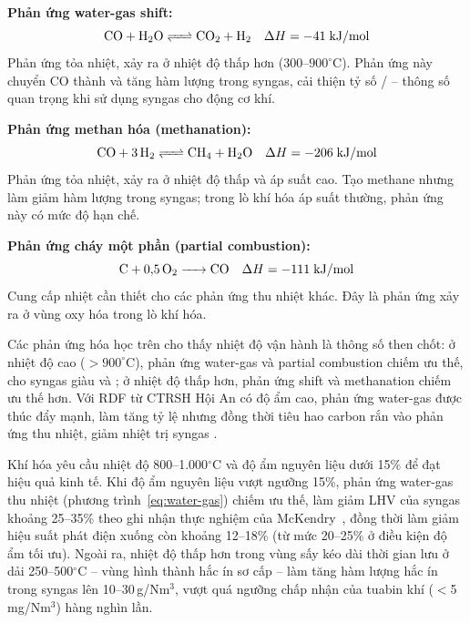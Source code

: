 \documentclass[../main.tex]{subfiles}
\begin{document}
\textbf{Phản ứng water-gas shift:}
\begin{equation}
\ce{CO + H2O <=> CO2 + H2} \quad \Delta H = -41 \;\text{kJ/mol}
\label{eq:shift}
\end{equation}
Phản ứng tỏa nhiệt, xảy ra ở nhiệt độ thấp hơn ($300$--$900^\circ\mathrm{C}$). Phản ứng này chuyển CO thành  và tăng hàm lượng  trong syngas, cải thiện tỷ số / -- thông số quan trọng khi sử dụng syngas cho động cơ khí.

\textbf{Phản ứng methan hóa (methanation):}
\begin{equation}
\ce{CO + 3H2 <=> CH4 + H2O} \quad \Delta H = -206 \;\text{kJ/mol}
\label{eq:methan}
\end{equation}
Phản ứng tỏa nhiệt, xảy ra ở nhiệt độ thấp và áp suất cao. Tạo methane nhưng làm giảm hàm lượng  trong syngas; trong lò khí hóa áp suất thường, phản ứng này có mức độ hạn chế.

\textbf{Phản ứng cháy một phần (partial combustion):}
\begin{equation}
\ce{C + 0,5 O2 -> CO} \quad \Delta H = -111 \;\text{kJ/mol}
\end{equation}
Cung cấp nhiệt cần thiết cho các phản ứng thu nhiệt khác. Đây là phản ứng xảy ra ở vùng oxy hóa trong lò khí hóa.

Các phản ứng hóa học trên cho thấy nhiệt độ vận hành là thông số then chốt: ở nhiệt độ cao ($> 900^\circ\mathrm{C}$), phản ứng water-gas và partial combustion chiếm ưu thế, cho syngas giàu  và ; ở nhiệt độ thấp hơn, phản ứng shift và methanation chiếm ưu thế hơn. Với RDF từ CTRSH Hội An có độ ẩm cao, phản ứng water-gas được thúc đẩy mạnh, làm tăng tỷ lệ  nhưng đồng thời tiêu hao carbon rắn vào phản ứng thu nhiệt, giảm nhiệt trị syngas \cite{Arena2012}.

Khí hóa yêu cầu nhiệt độ 800--1.000$^\circ\mathrm{C}$ và độ ẩm nguyên liệu dưới 15\% để đạt hiệu quả kinh tế. Khi độ ẩm nguyên liệu vượt ngưỡng 15\%, phản ứng water-gas thu nhiệt (phương trình~\ref{eq:water-gas}) chiếm ưu thế, làm giảm LHV của syngas khoảng 25--35\% theo ghi nhận thực nghiệm của McKendry~\cite{McKendry2002}, đồng thời làm giảm hiệu suất phát điện xuống còn khoảng 12--18\% (từ mức 20--25\% ở điều kiện độ ẩm tối ưu). Ngoài ra, nhiệt độ thấp hơn trong vùng sấy kéo dài thời gian lưu ở dải 250--500$^\circ\mathrm{C}$ -- vùng hình thành hắc ín sơ cấp -- làm tăng hàm lượng hắc ín trong syngas lên 10--30\,g/Nm$^3$, vượt quá ngưỡng chấp nhận của tuabin khí ($<$5\,mg/Nm$^3$) hàng nghìn lần.
\end{document}
